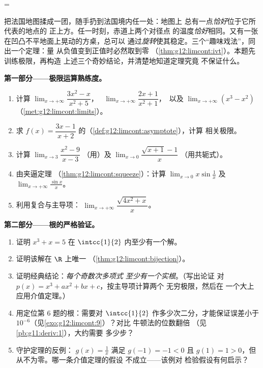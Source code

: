 =\begin{problem}
\label{pb:g12:limcont:1}
  把法国地图揉成一团，随手扔到法国境内任一处：地图上
  总有一点\emph{恰好}位于它所代表的地点的
  正上方。任一时刻，赤道上两个对径点
  的温度\emph{恰好}相同。又有一张
  在凹凸不平地面上晃动的方桌，总可以
  通过\emph{旋转}使其稳定。三个“趣味戏法”，同出一个定理：量
  从负值变到正值时必然取到零
  （\cref{thm:g12:limcont:ivt}）。本题先训练极限，再构造
  上述三个奇妙结论，并清楚地知道定理究竟
  不保证什么。

\medskip
\noindent\textbf{第一部分——极限运算熟练度。}
\begin{enumerate}
  \item 计算 $\lim_{x \to +\infty} \dfrac{3x^2 - x}{x^2 + 5}$，
        \ $\lim_{x \to +\infty} \dfrac{2x + 1}{x^2 + 1}$，\ 以及
        $\lim_{x \to +\infty} (x^3 - x^2)$
        （\cref{met:g12:limcont:limits}）。
  \item 求
        $f(x) = \dfrac{3x - 1}{x + 2}$
        的（\cref{def:g12:limcont:asymptote}），计算
        相关极限。
  \item 计算 $\lim_{x \to 3} \dfrac{x^2 - 9}{x - 3}$
        （用）及
        $\lim_{x \to 0} \dfrac{\sqrt{x + 1} - 1}{x}$
        （用共轭式）。
  \item 由夹逼定理
        （\cref{thm:g12:limcont:squeeze}）：计算
        $\lim_{x \to 0} x \sin\frac1x$ 及
        $\lim_{x \to +\infty} \frac{\sin x}{x}$。
  \item 利用复合与主导项：
        $\lim_{x \to +\infty} \dfrac{\sqrt{4x^2 + x}}{x}$。
\end{enumerate}

\medskip
\noindent\textbf{第二部分——根的严格验证。}
\begin{enumerate}[resume]
  \item 证明 $x^3 + x = 5$ 在
        $\intcc{1}{2}$ 内至少有一个解。
  \item 证明该解在 $\R$ 上唯一
        （\cref{thm:g12:limcont:bijection}）。
  \item 证明经典结论：\emph{每个奇数次多项式
        至少有一个实根}。（写出论证
        对 $p(x) = x^3 + a x^2 + b x + c$，按主导项计算两个
        无穷极限，然后在
        一个大上应用介值定理。）
  \item 用定位第 6 题的根：需要对
        $\intcc{1}{2}$ 作多少次二分，才能保证误差小于
        $10^{-6}$（见\cref{exo:g12:limcont:9}）？对比
        牛顿法的位数翻倍
        （见\cref{pb:g11:deriv:1}），大约需要
        多少步？
  \item 守护定理的反例：
        $g(x) = \frac1x$ 满足 $g(-1) = -1 < 0$ 且
        $g(1) = 1 > 0$，但从不为零。哪一条介值定理的假设
        不成立——该例对
        检验假设有何启示？
\end{enumerate}


\end{problem}

